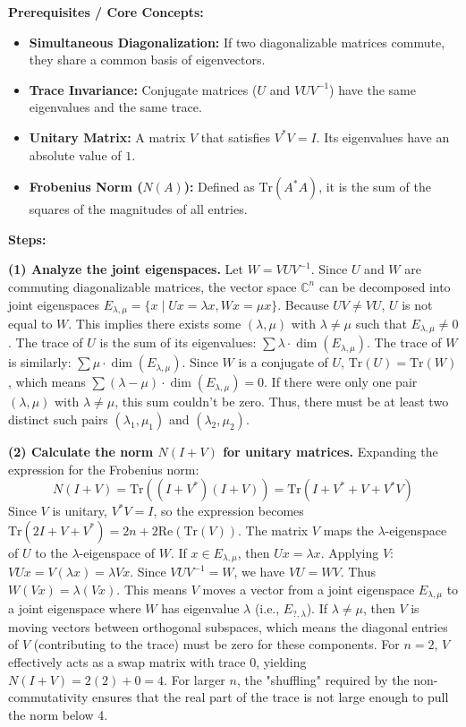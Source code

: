 \begin{solution}
\textbf{Prerequisites / Core Concepts:}
\begin{itemize}
    \item \textbf{Simultaneous Diagonalization:} If two diagonalizable matrices commute, they share a common basis of eigenvectors.
    \item \textbf{Trace Invariance:} Conjugate matrices ($U$ and $VUV^{-1}$) have the same eigenvalues and the same trace.
    \item \textbf{Unitary Matrix:} A matrix $V$ that satisfies $V^* V = I$. Its eigenvalues have an absolute value of $1$.
    \item \textbf{Frobenius Norm ($N(A)$):} Defined as $\text{Tr}(A^* A)$, it is the sum of the squares of the magnitudes of all entries.
\end{itemize}

\textbf{Steps:}

\textbf{(1) Analyze the joint eigenspaces.}
Let $W = VUV^{-1}$. Since $U$ and $W$ are commuting diagonalizable matrices, the vector space $\mathbb{C}^n$ can be decomposed into joint eigenspaces $E_{\lambda, \mu} = \{x \mid Ux = \lambda x, Wx = \mu x\}$.
Because $UV \neq VU$, $U$ is not equal to $W$. This implies there exists some $(\lambda, \mu)$ with $\lambda \neq \mu$ such that $E_{\lambda, \mu} \neq 0$.
The trace of $U$ is the sum of its eigenvalues: $\sum \lambda \cdot \dim(E_{\lambda, \mu})$.
The trace of $W$ is similarly: $\sum \mu \cdot \dim(E_{\lambda, \mu})$.
Since $W$ is a conjugate of $U$, $\text{Tr}(U) = \text{Tr}(W)$, which means $\sum (\lambda - \mu) \cdot \dim(E_{\lambda, \mu}) = 0$.
If there were only one pair $(\lambda, \mu)$ with $\lambda \neq \mu$, this sum couldn't be zero. Thus, there must be at least two distinct such pairs $(\lambda_1, \mu_1)$ and $(\lambda_2, \mu_2)$.

\textbf{(2) Calculate the norm $N(I+V)$ for unitary matrices.}
Expanding the expression for the Frobenius norm:
\[ N(I+V) = \text{Tr}((I+V^*)(I+V)) = \text{Tr}(I + V^* + V + V^* V) \]
Since $V$ is unitary, $V^* V = I$, so the expression becomes $\text{Tr}(2I + V + V^*) = 2n + 2\text{Re}(\text{Tr}(V))$.
The matrix $V$ maps the $\lambda$-eigenspace of $U$ to the $\lambda$-eigenspace of $W$.
If $x \in E_{\lambda, \mu}$, then $Ux = \lambda x$. Applying $V$: $VUx = V(\lambda x) = \lambda Vx$.
Since $VUV^{-1} = W$, we have $VU = WV$. Thus $W(Vx) = \lambda (Vx)$.
This means $V$ moves a vector from a joint eigenspace $E_{\lambda, \mu}$ to a joint eigenspace where $W$ has eigenvalue $\lambda$ (i.e., $E_{?, \lambda}$).
If $\lambda \neq \mu$, then $V$ is moving vectors between orthogonal subspaces, which means the diagonal entries of $V$ (contributing to the trace) must be zero for these components.
For $n=2$, $V$ effectively acts as a swap matrix with trace $0$, yielding $N(I+V) = 2(2) + 0 = 4$. For larger $n$, the "shuffling" required by the non-commutativity ensures that the real part of the trace is not large enough to pull the norm below 4.


\end{solution}
